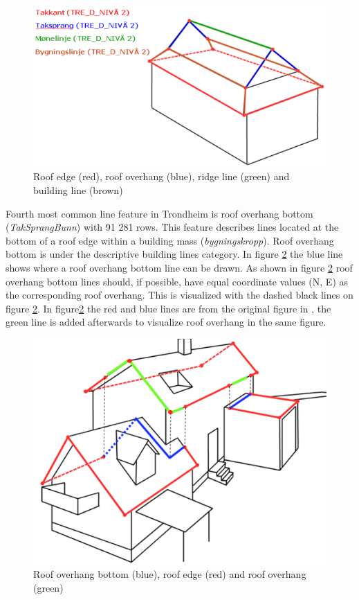 \begin{figure}[H]
    \centering
    \includegraphics[scale=0.5]{figures/kurve_4tak_fkb2.png}
    \caption{Roof edge (red), roof overhang (blue), ridge line (green) and building line (brown) \cite{Kartverket2013a}}
    \label{fig:kurve_4tak_fkb}
\end{figure} 

Fourth most common line feature in Trondheim is roof overhang bottom (\textit{TakSprangBunn}) with 91 281 rows. This feature describes lines located at the bottom of a roof edge within a building mass (\textit{bygningskropp}). Roof overhang bottom is under the descriptive building lines category. In figure \ref{fig:taksprangbunn} the blue line shows where a roof overhang bottom line can be drawn. As shown in figure \ref{fig:taksprangbunn} roof overhang bottom lines should, if possible, have equal coordinate values (N, E) as the corresponding roof overhang. This is visualized with the dashed black lines on figure \ref{fig:taksprangbunn}. In figure\ref{fig:taksprangbunn} the red and blue lines are from the original figure in \cite{Kartverket2013a}, the green line is added afterwards to visualize roof overhang in the same figure.  

\begin{figure}[H]
    \centering
    \includegraphics[scale=0.4]{figures/FixedByMe/kurve_3fkb_tak.png}
    \caption{Roof overhang bottom (blue), roof edge (red) and roof overhang (green)}
    \label{fig:taksprangbunn}
\end{figure} 


